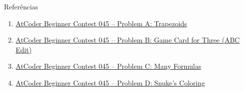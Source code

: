 \begin{frame}[fragile]{Referências}

    \begin{enumerate}
        \item \href{https://atcoder.jp/contests/abc045/tasks/abc045_a}{AtCoder Beginner Contest 
            045 -- Problem A: Trapezoids}

        \item \href{https://atcoder.jp/contests/abc045/tasks/abc045_b}{AtCoder Beginner Contest 
            045 -- Problem B: Game Card for Three (ABC Edit)}

        \item \href{https://atcoder.jp/contests/abc045/tasks/arc061_a}{AtCoder Beginner Contest
            045 -- Problem C: Many Formulas}

        \item \href{https://atcoder.jp/contests/abc045/tasks/arc061_b}{AtCoder Beginner Contest
            045 -- Problem D: Snuke's Coloring}
    \end{enumerate}

\end{frame}
